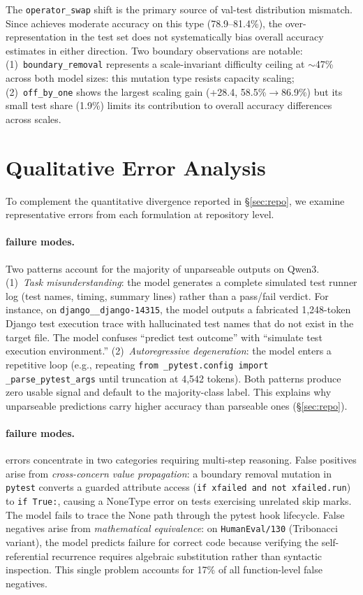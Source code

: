 The \texttt{operator\_swap} shift is the primary source of val-test distribution mismatch. Since \cls{} achieves moderate accuracy on this type (78.9--81.4\%), the over-representation in the test set does not systematically bias overall accuracy estimates in either direction. Two boundary observations are notable: (1)~\texttt{boundary\_removal} represents a scale-invariant difficulty ceiling at ${\sim}$47\% across both model sizes: this mutation type resists capacity scaling; (2)~\texttt{off\_by\_one} shows the largest scaling gain (+28.4\pp{}, 58.5\%$\to$86.9\%) but its small test share (1.9\%) limits its contribution to overall accuracy differences across scales.

\section{Qualitative Error Analysis}
\label{app:qualitative}

To complement the quantitative divergence reported in \S\ref{sec:repo}, we examine representative errors from each formulation at repository level.

\paragraph{\cwm{} failure modes.}
Two patterns account for the majority of unparseable \cwm{} outputs on Qwen3. (1)~\emph{Task misunderstanding}: the model generates a complete simulated test runner log (test names, timing, summary lines) rather than a pass/fail verdict. For instance, on \texttt{django\_\_django-14315}, the model outputs a fabricated 1,248-token Django test execution trace with hallucinated test names that do not exist in the target file. The model confuses ``predict test outcome'' with ``simulate test execution environment.'' (2)~\emph{Autoregressive degeneration}: the model enters a repetitive loop (e.g., repeating \texttt{from \_pytest.config import \_parse\_pytest\_args} until truncation at 4,542 tokens). Both patterns produce zero usable signal and default to the majority-class label. This explains why unparseable predictions carry higher accuracy than parseable ones (\S\ref{sec:repo}).

\paragraph{\cls{} failure modes.}
\cls{} errors concentrate in two categories requiring multi-step reasoning. False positives arise from \emph{cross-concern value propagation}: a boundary removal mutation in \texttt{pytest} converts a guarded attribute access (\texttt{if xfailed and not xfailed.run}) to \texttt{if True:}, causing a NoneType error on tests exercising unrelated skip marks. The model fails to trace the None path through the pytest hook lifecycle. False negatives arise from \emph{mathematical equivalence}: on \texttt{HumanEval/130} (Tribonacci variant), the model predicts failure for correct code because verifying the self-referential recurrence requires algebraic substitution rather than syntactic inspection. This single problem accounts for 17\% of all function-level false negatives.

